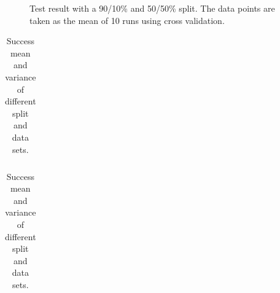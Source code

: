 \begin{figure}[h]
\centering
\caption[Cross validation]{Test result with a 90/10\% and 50/50\% split. The data points are taken as the mean of 10 runs using cross validation.}
\label{fig:PersonDependent_9010}
\end{figure}

\begin{table}[h]
\centering
    \begin{subtable}[b]{0.56\textwidth}
    \centering
        \begin{tabular}{lcccccc}
%             
        \end{tabular}
        \caption{Mean success rate}
    \end{subtable}
    \begin{subtable}[b]{0.42\textwidth}
    \centering
        \begin{tabular}{lcccccc}
%             
        \end{tabular}
        \caption{Variance in success rate}
    \end{subtable}
    \caption[Success of functions]{Success mean and variance of different split and data sets.}
    \label{tb:cross}
\end{table}



